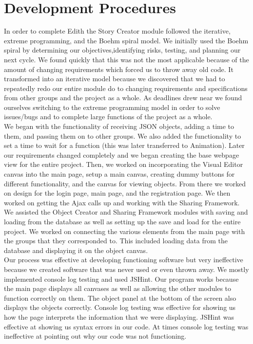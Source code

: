 \documentclass[12pt]{article}
\begin{document}
\section{Development Procedures}
In order to complete Edith the Story Creator module followed the iterative, extreme programming, and the Boehm spiral model.  We initially used the Boehm spiral by determining our objectives,identifying risks, testing, and planning our next cycle.  We found quickly that this was not the most applicable because of the amount of changing requirements which forced us to throw away old code.  It transformed into an iterative model because we discovered that we had to repeatedly redo our entire module do to changing requirements and specifications from other groups and the project as a whole.  As deadlines drew near we found ourselves switching to the extreme programming model in order to solve issues/bugs and to complete large functions of the project as a whole.  \\

We began with the functionality of receiving JSON objects, adding a time to them, and passing them on to other groups.  We also added the functionality to set a time to wait for a function (this was later transferred to Animation).  Later our requirements changed completely and we began creating the base webpage view for the entire project.  Then, we worked on incorporating the Visual Editor canvas into the main page, setup a main canvas, creating dummy buttons for different functionality, and the canvas for viewing objects.  From there we worked on design for the login page, main page, and the registration page.  We then worked on getting the Ajax calls up and working with the Sharing Framework.  We assisted the Object Creator and Sharing Framework modules with saving and loading from the database as well as setting up the save and load for the entire project.  We worked on connecting the various elements from the main page with the groups that they corresponded to.  This included loading data from the database and displaying it on the object canvas.  \\

Our process was effective at developing functioning software but very ineffective because we created software that was never used or even thrown away.  We mostly implemented console log testing and used JSHint.  Our program works because the main page displays all canvases as well as allowing the other modules to function correctly on them.  The object panel at the bottom of the screen also displays the objects correctly.  Console log testing was effective for showing us how the page interprets the information that we were displaying.  JSHint was effective at showing us syntax errors in our code.  At times console log testing was ineffective at pointing out why our code was not functioning.  \\
\end{document}
